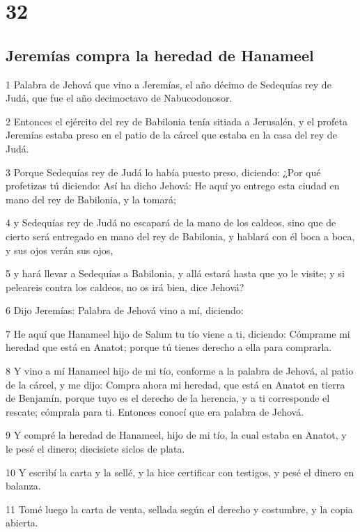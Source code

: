 \chapter{32}

\section*{Jeremías compra la heredad de Hanameel}

\par 1 Palabra de Jehová que vino a Jeremías, el año décimo de Sedequías rey de Judá, que fue el año decimoctavo de Nabucodonosor.
\par 2 Entonces el ejército del rey de Babilonia tenía sitiada a Jerusalén, y el profeta Jeremías estaba preso en el patio de la cárcel que estaba en la casa del rey de Judá.
\par 3 Porque Sedequías rey de Judá lo había puesto preso, diciendo: ¿Por qué profetizas tú diciendo: Así ha dicho Jehová: He aquí yo entrego esta ciudad en mano del rey de Babilonia, y la tomará;
\par 4 y Sedequías rey de Judá no escapará de la mano de los caldeos, sino que de cierto será entregado en mano del rey de Babilonia, y hablará con él boca a boca, y sus ojos verán sus ojos,
\par 5 y hará llevar a Sedequías a Babilonia, y allá estará hasta que yo le visite; y si peleareis contra los caldeos, no os irá bien, dice Jehová?
\par 6 Dijo Jeremías: Palabra de Jehová vino a mí, diciendo:
\par 7 He aquí que Hanameel hijo de Salum tu tío viene a ti, diciendo: Cómprame mi heredad que está en Anatot; porque tú tienes derecho a ella para comprarla.
\par 8 Y vino a mí Hanameel hijo de mi tío, conforme a la palabra de Jehová, al patio de la cárcel, y me dijo: Compra ahora mi heredad, que está en Anatot en tierra de Benjamín, porque tuyo es el derecho de la herencia, y a ti corresponde el rescate; cómprala para ti. Entonces conocí que era palabra de Jehová.
\par 9 Y compré la heredad de Hanameel, hijo de mi tío, la cual estaba en Anatot, y le pesé el dinero; diecisiete siclos de plata.
\par 10 Y escribí la carta y la sellé, y la hice certificar con testigos, y pesé el dinero en balanza.
\par 11 Tomé luego la carta de venta, sellada según el derecho y costumbre, y la copia abierta.
